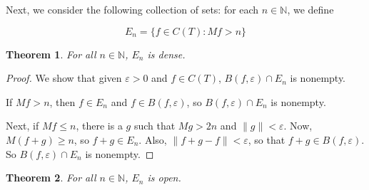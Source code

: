 \documentclass{amsart}
\newcommand{\vep}{\varepsilon}
\newcommand{\N}{\mathbb{N}}
\newcommand{\norm}[1]{\|#1\|}
\newtheorem{thm}{Theorem}[section]
\theoremstyle{definition}
\begin{document}
Next, we consider the following collection of sets: for each $n \in \N$, we define

\begin{displaymath}
E_n = \{f \in C(T) : Mf > n\}
\end{displaymath}

\begin{thm}
For all $n \in \N$, $E_n$ is dense.
\end{thm}

\begin{proof}

We show that given $\vep>0$ and $f \in C(T)$, $B(f,\vep) \cap E_n$ is nonempty. 

If $Mf > n$, then $f \in E_n$ and $f \in B(f, \vep)$, so $B(f, \vep) \cap E_n$ is nonempty.

Next, if $Mf \leq n$, there is a $g$ such that $Mg > 2n$ and $\norm{g} < \vep$. 
Now, $M(f+g) \geq n$, so $f+g \in E_n$. 
Also, $\norm{f+g -f} < \vep$, so that $f+g \in B(f, \vep)$. 
So $B(f, \vep) \cap E_n$ is nonempty.

\end{proof}

\begin{thm}
For all $n \in \N$, $E_n$ is open.
\end{thm}
\end{document}

